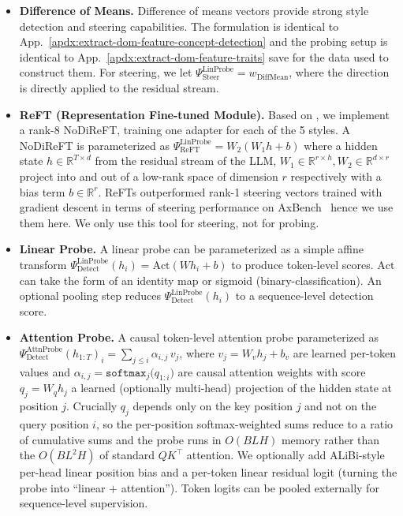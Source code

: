 \documentclass{article} %
\begin{document}
\begin{itemize}[leftmargin=*]
    \item \textbf{Difference of Means.} Difference of means vectors provide strong style detection and steering capabilities. The formulation is identical to App.~\ref{apdx:extract-dom-feature-concept-detection} and the probing setup is identical to App.~\ref{apdx:extract-dom-feature-traits} save for the data used to construct them. For steering, we let $\Psi^{\text{LinProbe}}_{\text{Steer}}=w_\text{DiffMean}$, where the direction is directly applied to the residual stream.

    \item \textbf{ReFT (Representation Fine-tuned Module).} Based on \cite{wu2024reft}, we implement a rank-8 NoDiReFT, training one adapter for each of the 5 styles. A NoDiReFT is parameterized as $\Psi^{\text{LinProbe}}_{\text{ReFT}}=W_2(W_1h+b)$ where a hidden state $h\in \mathbb R^{T\times d}$ from the residual stream of the LLM, $W_1\in \mathbb R^{r\times h},W_2\in \mathbb R^{d\times r}$ project into and out of a low-rank space of dimension $r$ respectively with a bias term $b\in \mathbb R^r$. ReFTs outperformed rank-1 steering vectors trained with gradient descent in terms of steering performance on AxBench~\citep{wu2025axbench} hence we use them here. We only use this tool for steering, not for probing.

    \item \textbf{Linear Probe.} A linear probe can be parameterized as a simple affine transform $\Psi^{\text{LinProbe}}_{\text{Detect}}(h_i)=\mathrm{Act}\left(Wh_i+b\right)$ to produce token-level scores. $\mathrm{Act}$ can take the form of an identity map or sigmoid (binary-classification). An optional pooling step reduces $\Psi^{\text{LinProbe}}_{\text{Detect}}(h_i)$ to a sequence-level detection score. 
    
    \item \textbf{Attention Probe.} A causal token-level attention probe
    parameterized as
    $\Psi^{\text{AttnProbe}}_{\text{Detect}}(h_{1:T})_i
       = \sum_{j \le i} \alpha_{i,j}\, v_j$,
    where $v_j = W_v h_j + b_v$ are learned per-token values and
    $\alpha_{i,j} = \mathtt{softmax}_j\!\bigl(q_{1:i}\bigr)$ are causal
    attention weights with score $q_j = W_q h_j$ a learned (optionally
    multi-head) projection of the hidden state at position $j$. Crucially
    $q_j$ depends only on the key position $j$ and not on the query position
    $i$, so the per-position softmax-weighted sums reduce to a ratio of
    cumulative sums and the probe runs in $O(B L H)$ memory rather than the
    $O(B L^2 H)$ of standard $QK^\top$ attention. We optionally add
    ALiBi-style per-head linear position bias and a per-token linear
    residual logit (turning the probe into ``linear $+$ attention''). Token
    logits can be pooled externally for sequence-level supervision. 

\end{itemize}
\end{document}
